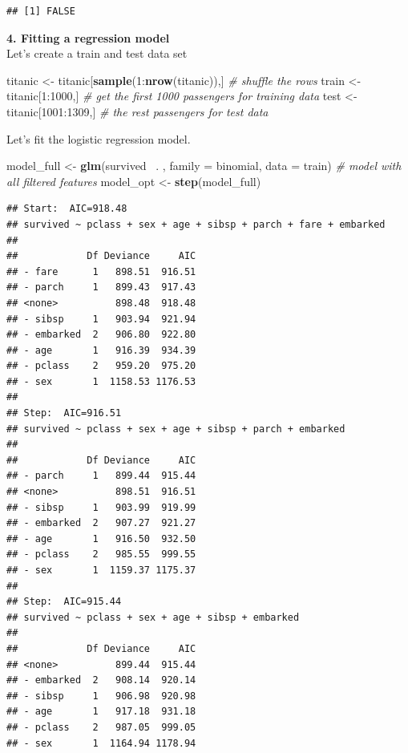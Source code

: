 \documentclass[12,]{article}
\newenvironment{Shaded}{\begin{snugshade}}{\end{snugshade}}
\newcommand{\KeywordTok}[1]{\textcolor[rgb]{0.13,0.29,0.53}{\textbf{{#1}}}}
\newcommand{\DataTypeTok}[1]{\textcolor[rgb]{0.13,0.29,0.53}{{#1}}}
\newcommand{\DecValTok}[1]{\textcolor[rgb]{0.00,0.00,0.81}{{#1}}}
\newcommand{\StringTok}[1]{\textcolor[rgb]{0.31,0.60,0.02}{{#1}}}
\newcommand{\CommentTok}[1]{\textcolor[rgb]{0.56,0.35,0.01}{\textit{{#1}}}}
\newcommand{\NormalTok}[1]{{#1}}
\begin{document}
\begin{verbatim}
## [1] FALSE
\end{verbatim}

\textbf{4. Fitting a regression model}\\
Let's create a train and test data set

\begin{Shaded}
\begin{Highlighting}[]
\NormalTok{titanic <-}\StringTok{ }\NormalTok{titanic[}\KeywordTok{sample}\NormalTok{(}\DecValTok{1}\NormalTok{:}\KeywordTok{nrow}\NormalTok{(titanic)),] }\CommentTok{# shuffle the rows}
\NormalTok{train <-}\StringTok{ }\NormalTok{titanic[}\DecValTok{1}\NormalTok{:}\DecValTok{1000}\NormalTok{,] }\CommentTok{# get the first 1000 passengers for training data}
\NormalTok{test <-}\StringTok{ }\NormalTok{titanic[}\DecValTok{1001}\NormalTok{:}\DecValTok{1309}\NormalTok{,] }\CommentTok{# the rest passengers for test data}
\end{Highlighting}
\end{Shaded}

Let's fit the logistic regression model.

\begin{Shaded}
\begin{Highlighting}[]
\NormalTok{model_full <-}\StringTok{ }\KeywordTok{glm}\NormalTok{(survived ~. , }\DataTypeTok{family =} \NormalTok{binomial, }\DataTypeTok{data =} \NormalTok{train) }\CommentTok{# model with all filtered features}
\NormalTok{model_opt <-}\StringTok{ }\KeywordTok{step}\NormalTok{(model_full) }
\end{Highlighting}
\end{Shaded}

\begin{verbatim}
## Start:  AIC=918.48
## survived ~ pclass + sex + age + sibsp + parch + fare + embarked
## 
##            Df Deviance     AIC
## - fare      1   898.51  916.51
## - parch     1   899.43  917.43
## <none>          898.48  918.48
## - sibsp     1   903.94  921.94
## - embarked  2   906.80  922.80
## - age       1   916.39  934.39
## - pclass    2   959.20  975.20
## - sex       1  1158.53 1176.53
## 
## Step:  AIC=916.51
## survived ~ pclass + sex + age + sibsp + parch + embarked
## 
##            Df Deviance     AIC
## - parch     1   899.44  915.44
## <none>          898.51  916.51
## - sibsp     1   903.99  919.99
## - embarked  2   907.27  921.27
## - age       1   916.50  932.50
## - pclass    2   985.55  999.55
## - sex       1  1159.37 1175.37
## 
## Step:  AIC=915.44
## survived ~ pclass + sex + age + sibsp + embarked
## 
##            Df Deviance     AIC
## <none>          899.44  915.44
## - embarked  2   908.14  920.14
## - sibsp     1   906.98  920.98
## - age       1   917.18  931.18
## - pclass    2   987.05  999.05
## - sex       1  1164.94 1178.94
\end{verbatim}
\end{document}
